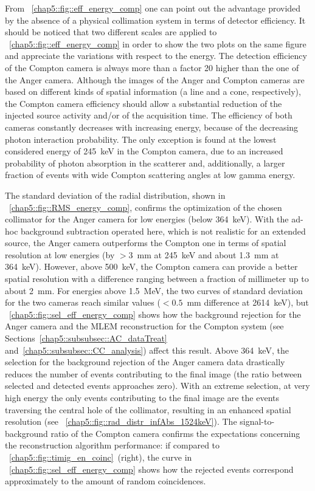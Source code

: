From \figurename~\ref{chap5::fig::eff_energy_comp} one can point out the advantage provided by the absence of a physical collimation system in terms of detector efficiency. It should be noticed that two different scales are applied to \figurename~\ref{chap5::fig::eff_energy_comp} in order to show the two plots on the same figure and appreciate the variations with respect to the energy. The detection efficiency of the Compton camera is always more than a factor 20 higher than the one of the Anger camera. Although the images of the Anger and Compton cameras are based on different kinds of spatial information (a line and a cone, respectively), the Compton camera efficiency should allow a substantial reduction of the injected source activity and/or of the acquisition time. The efficiency of both cameras constantly decreases with increasing energy, because of the decreasing photon interaction probability. The only exception is found at the lowest considered energy of 245~keV in the Compton camera, due to an increased  probability of photon absorption in the scatterer and, additionally, a larger fraction of events with wide Compton scattering angles at low gamma energy.

The standard deviation of the radial distribution, shown in \figurename~\ref{chap5::fig::RMS_energy_comp}, confirms the optimization of the chosen collimator for the Anger camera for low energies (below 364~keV). With the ad-hoc background subtraction operated here, which is not realistic for an extended source, the Anger camera outperforms the Compton one in terms of spatial resolution at low energies (by $>3$~mm at 245~keV and about 1.3~mm at 364~keV). However, above 500~keV, the Compton camera can provide a better spatial resolution with a difference ranging between a fraction of millimeter up to about 2~mm. For energies above 1.5~MeV, the two curves of standard deviation for the two cameras reach similar values ($<0.5$~mm difference at 2614~keV), but \figurename~\ref{chap5::fig::sel_eff_energy_comp} shows how the background rejection for the Anger camera and the MLEM reconstruction for the Compton system (see Sections~\ref{chap5::subsubsec::AC_dataTreat} and~\ref{chap5::subsubsec::CC_analysis}) affect this result. Above 364~keV, the selection for the background rejection of the Anger camera data drastically reduces the number of events contributing to the final image (the ratio between selected and detected events approaches zero). With an extreme selection, at very high energy the only events contributing to the final image are the events traversing the central hole of the collimator, resulting in an enhanced spatial resolution (see \figurename~\ref{chap5::fig::rad_distr_infAbs_1524keV}). The signal-to-background ratio of the Compton camera confirms the expectations concerning the reconstruction algorithm performance: if compared to \figurename~\ref{chap5::fig::timig_en_coinc}~(right), the curve in \figurename~\ref{chap5::fig::sel_eff_energy_comp} shows how the rejected events correspond approximately to the amount of random coincidences.
              

